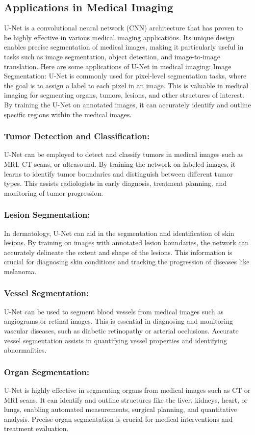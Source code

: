 \documentclass[conference]{IEEEtran}
\begin{document}
\subsection{Applications in Medical Imaging}
U-Net is a convolutional neural network (CNN) architecture that has proven to be highly effective in various medical imaging applications. Its unique design enables precise segmentation of medical images, making it particularly useful in tasks such as image segmentation, object detection, and image-to-image translation. Here are some applications of U-Net in medical imaging:
Image Segmentation: U-Net is commonly used for pixel-level segmentation tasks, where the goal is to assign a label to each pixel in an image. This is valuable in medical imaging for segmenting organs, tumors, lesions, and other structures of interest. By training the U-Net on annotated images, it can accurately identify and outline specific regions within the medical images.
\subsubsection{Tumor Detection and Classification:}
 U-Net can be employed to detect and classify tumors in medical images such as MRI, CT scans, or ultrasound. By training the network on labeled images, it learns to identify tumor boundaries and distinguish between different tumor types. This assists radiologists in early diagnosis, treatment planning, and monitoring of tumor progression.
 \subsubsection{Lesion Segmentation:}
 In dermatology, U-Net can aid in the segmentation and identification of skin lesions. By training on images with annotated lesion boundaries, the network can accurately delineate the extent and shape of the lesions. This information is crucial for diagnosing skin conditions and tracking the progression of diseases like melanoma.
  \subsubsection{Vessel Segmentation:}
 U-Net can be used to segment blood vessels from medical images such as angiograms or retinal images. This is essential in diagnosing and monitoring vascular diseases, such as diabetic retinopathy or arterial occlusions. Accurate vessel segmentation assists in quantifying vessel properties and identifying abnormalities.
 \subsubsection{Organ Segmentation:}
 U-Net is highly effective in segmenting organs from medical images such as CT or MRI scans. It can identify and outline structures like the liver, kidneys, heart, or lungs, enabling automated measurements, surgical planning, and quantitative analysis. Precise organ segmentation is crucial for medical interventions and treatment evaluation.
\end{document}
